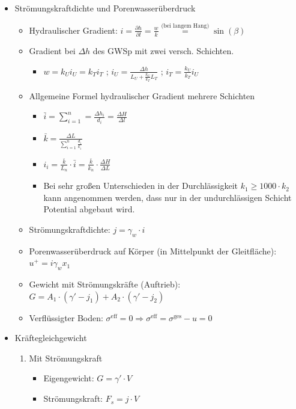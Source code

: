 \documentclass[fleqn,twoside]{article}
\begin{document}
\begin{itemize}
	\item Strömungskraftdichte und Porenwasserüberdruck
	\begin{itemize}
		\item Hydraulischer Gradient: $i=\frac{\partial h}{\partial l}=\frac{w}{k} \stackrel{\text{(bei langem Hang)}}{=}  \sin(\beta) $
		\item Gradient bei $\Delta h$ des GWSp mit zwei versch. Schichten.
		\begin{itemize}
			\item $w=k_U i_U = k_T i_T$ ; $i_U = \frac{\Delta h}{L_U + \frac{k_U}{k_T}L_T}$ ; $i_T = \frac{k_U}{k_T} i_U$
		\end{itemize}
		\item Allgemeine Formel hydraulischer Gradient mehrere Schichten
		\begin{itemize}
		    \item $\bar{i} = \sum\limits_{i=1}^n = \frac{\Delta h_i}{d_i} = \frac{\Delta H}{\Delta l}$
		    \item $ \bar{k} = \frac{\Delta L}{\sum\limits_{i=1}^n \frac{d_i}{k_i} }$
		    \item $i_i = \frac{\bar{k}}{L_n} \cdot \bar{i} = \frac{\bar{k}}{k_n} \cdot \frac{\Delta H}{\Delta L}$
		    \item Bei sehr großen Unterschieden in der Durchlässigkeit $k_1 \geq 1000 \cdot k_2$ kann angenommen werden, dass nur in der undurchlässigen Schicht Potential abgebaut wird.
		\end{itemize}
		\item Strömungskraftdichte: $j= \gamma_w \cdot i$
		\item Porenwasserüberdruck auf Körper (in Mittelpunkt der Gleitfläche): $u^+=i\gamma_wx_1$
		\item Gewicht mit Strömungskräfte (Auftrieb): $G = A_1 \cdot (\gamma' - j_1) + A_2 \cdot (\gamma' - j_2)$
		\item Verflüssigter Boden: $\sigma^{\text{eff}} = 0 \Rightarrow \sigma^{\text{eff}} = \sigma^{\text{ges}} - u =0 $
	\end{itemize}
	\item Kräftegleichgewicht
	\begin{enumerate}
		\item Mit Strömungskraft
		\begin{itemize}
			\item Eigengewicht: $G=\gamma' \cdot V$
			\item Strömungskraft: $F_s=j \cdot V$
		\end{itemize}

\end{enumerate}
\end{itemize}
\end{document}
